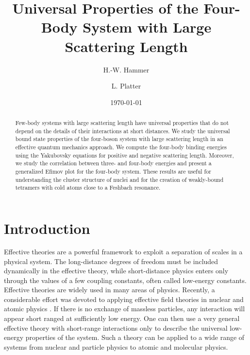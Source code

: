 \documentclass[prc,preprint,showpacs,tightenlines,%
nofootinbib]{revtex4}
\begin{document}
%
%
\title{Universal Properties of the Four-Body System 
with Large Scattering Length}
%
\author{H.-W. Hammer}
%
\author{L. Platter}
%
\date{\today}
\begin{abstract}
Few-body systems with large scattering length have universal 
properties that do not depend on the details of their interactions
at short distances. We study the universal bound state properties of the 
four-boson system with large scattering length in an effective 
quantum mechanics approach. We compute the four-body binding energies 
using the Yakubovsky equations for positive and negative scattering length.
Moreover, we study the correlation between three- and four-body
energies and present a generalized Efimov plot for the  four-body
system. These results are useful for understanding the cluster structure 
of nuclei and for the creation of weakly-bound tetramers with cold atoms
close to a Feshbach resonance.
\end{abstract}
%
\keywords{}
\maketitle
%
\section{Introduction}
%
\label{sec:intro}
Effective theories are a powerful framework to exploit a separation
of scales in a physical system.
The long-distance degrees of freedom must be included dynamically 
in the effective theory, while short-distance physics enters only 
through the values of a few coupling constants, often called
low-energy constants.
Effective theories are widely used in many areas of physics.  
Recently, a considerable effort was devoted to applying
effective field theories in nuclear and atomic physics
\cite{Bedaque:2002mn,Epelbaum:2005pn,Braaten:2004rn}.
If there is no exchange of massless particles, any interaction will
appear short ranged at sufficiently low energy. One can then use
a very general effective theory with short-range interactions only
to describe the universal low-energy properties of the system. 
Such a theory can be applied to a wide range of systems 
from nuclear and particle physics to atomic and molecular physics.
\end{document}
